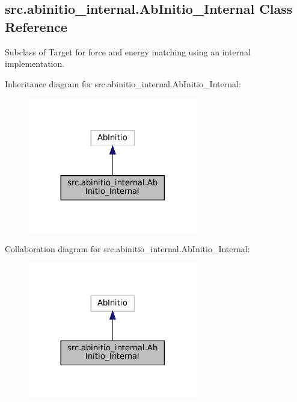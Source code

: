 \hypertarget{classsrc_1_1abinitio__internal_1_1AbInitio__Internal}{}\subsection{src.\+abinitio\+\_\+internal.\+Ab\+Initio\+\_\+\+Internal Class Reference}
\label{classsrc_1_1abinitio__internal_1_1AbInitio__Internal}


Subclass of Target for force and energy matching using an internal implementation.  




Inheritance diagram for src.\+abinitio\+\_\+internal.\+Ab\+Initio\+\_\+\+Internal\+:
\nopagebreak
\begin{figure}[H]
\begin{center}
\leavevmode
\includegraphics[width=209pt]{classsrc_1_1abinitio__internal_1_1AbInitio__Internal__inherit__graph}
\end{center}
\end{figure}


Collaboration diagram for src.\+abinitio\+\_\+internal.\+Ab\+Initio\+\_\+\+Internal\+:
\nopagebreak
\begin{figure}[H]
\begin{center}
\leavevmode
\includegraphics[width=209pt]{classsrc_1_1abinitio__internal_1_1AbInitio__Internal__coll__graph}
\end{center}
\end{figure}
